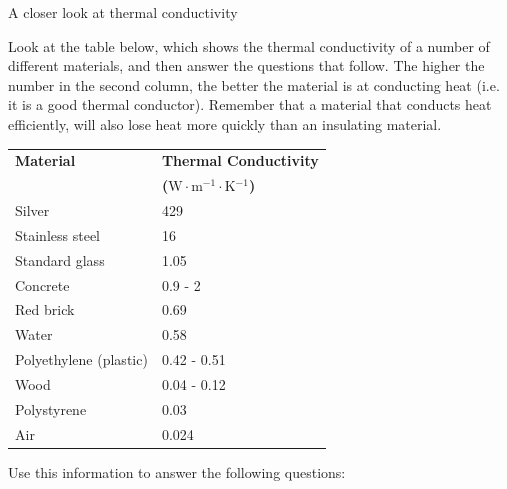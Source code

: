 \label{m38706*secfhsst!!!underscore!!!id492}
            \begin{Investigation}{A closer look at thermal conductivity}
{            \nopagebreak
      \label{m38706*id66744}Look at the table below, which shows the thermal conductivity of a number of different materials, and then answer the questions that follow. The higher the number in the second column, the better the material is at conducting heat (i.e. it is a good thermal conductor). Remember that a material that conducts heat efficiently, will also lose heat more quickly than an insulating material.\par 
          \begin{table}[H]
        \begin{center}
      \label{m38706*id66753}
    \noindent
      \begin{tabular}{|l|l|}\hline
\textbf{Material} & \textbf{Thermal Conductivity} \\ 
                 &  \textbf{($\text{W}\ensuremath{\cdot}\text{m}{}^{-1}\ensuremath{\cdot}\text{K}{}^{-1}$) } \\ \hline
Silver & 429 \\ \hline
Stainless steel & 16 \\ \hline
Standard glass & 1.05 \\ \hline
Concrete & 0.9 - 2 \\ \hline
Red brick & 0.69 \\ \hline
Water & 0.58 \\ \hline
Polyethylene (plastic) & 0.42 - 0.51 \\ \hline
Wood & 0.04 - 0.12 \\ \hline
Polystyrene & 0.03 \\ \hline
Air & 0.024 \\ \hline
    \end{tabular}
      \end{center}
\end{table}
    \par
      \label{m38706*id67009}Use this information to answer the following questions:\par 
}
\end{Investigation}
